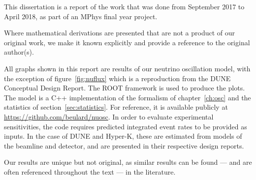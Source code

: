 %
%        
%        

This dissertation is a report of the work that was done from September 2017 to
April 2018, as part of an MPhys final year project.

Where mathematical derivations are presented that are not a product of our
original work, we make it known explicitly and provide a reference to the
original author(s).


All graphs shown in this report are results of our neutrino oscillation
model, with the exception of figure~\ref{fig:nuflux} which is a reproduction
from the DUNE Conceptual Design Report\cite{cdr}. The ROOT framework\cite{ROOT}
is used to produce the plots.
The model is a C++ implementation of the formalism of chapter~\ref{ch:osc} and
the statistics of section~\ref{sec:statistics}. For
reference, it is available publicly at
\href{url}{https://github.com/beulard/nuosc}.
In order to evaluate experimental sensitivities, the code requires predicted
integrated event rates to be provided as inputs. In the case of DUNE and Hyper-K,
these are estimated from models of the beamline and detector, and are
presented in their respective design reports\cite{cdr, hyperk}.

Our results are unique but not original, as similar results can be found ---
and are often referenced throughout the text --- in the literature.


